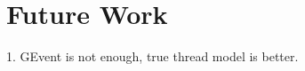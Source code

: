 
\section{Future Work} %
\label{sec:future_work}
1. GEvent is not enough, true thread model is better.
